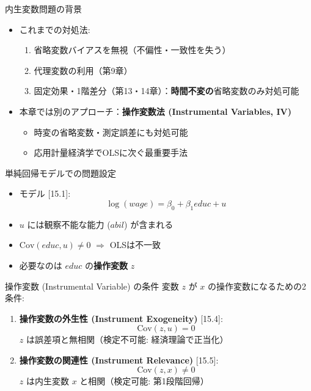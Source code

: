 \documentclass[
  ignorenonframetext,
]{beamer}
\providecommand{\tightlist}{%
  \setlength{\itemsep}{0pt}\setlength{\parskip}{0pt}}
\begin{document}
\begin{frame}{内生変数問題の背景}
\label{ux5185ux751fux5909ux6570ux554fux984cux306eux80ccux666f}
\begin{itemize}
\tightlist
\item
  これまでの対処法:

  \begin{enumerate}
  \tightlist
  \item
    省略変数バイアスを無視（不偏性・一致性を失う）
  \item
    代理変数の利用（第9章）
  \item
    固定効果・1階差分（第13・14章）：\textbf{時間不変の}省略変数のみ対処可能
  \end{enumerate}
\item
  本章では別のアプローチ：\textbf{操作変数法 (Instrumental Variables,
  IV)}

  \begin{itemize}
  \tightlist
  \item
    時変の省略変数・測定誤差にも対処可能
  \item
    応用計量経済学でOLSに次ぐ最重要手法
  \end{itemize}
\end{itemize}
\end{frame}

\begin{frame}{単純回帰モデルでの問題設定}
\label{ux5358ux7d14ux56deux5e30ux30e2ux30c7ux30ebux3067ux306eux554fux984cux8a2dux5b9a}
\begin{itemize}
\tightlist
\item
  モデル {[}15.1{]}: \[\log(wage) = \beta_0 + \beta_1 educ + u\]
\item
  \(u\) には観察不能な能力 (\(abil\)) が含まれる
\item
  \(\text{Cov}(educ, u) \neq 0\) \(\Rightarrow\) OLSは不一致
\item
  必要なのは \(educ\) の\textbf{操作変数} \(z\)
\end{itemize}
\end{frame}

\begin{frame}{操作変数 (Instrumental Variable) の条件}
\label{ux64cdux4f5cux5909ux6570-instrumental-variable-ux306eux6761ux4ef6}
変数 \(z\) が \(x\) の操作変数になるための2条件:

\begin{enumerate}
\item
  \textbf{操作変数の外生性 (Instrument Exogeneity)} {[}15.4{]}:
  \[\text{Cov}(z, u) = 0\] \(z\) は誤差項と無相関（検定不可能:
  経済理論で正当化）
\item
  \textbf{操作変数の関連性 (Instrument Relevance)} {[}15.5{]}:
  \[\text{Cov}(z, x) \neq 0\] \(z\) は内生変数 \(x\) と相関（検定可能:
  第1段階回帰）
\end{enumerate}
\end{frame}
\end{document}
